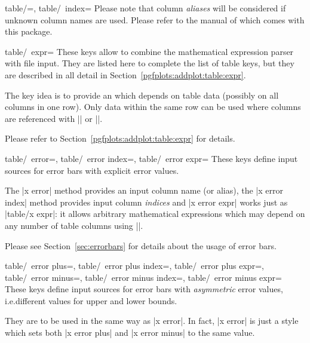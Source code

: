 {\begin{pgfplotsxykeylist}{table/\x=,
    table/\x\ index=}
    Please note that column \emph{aliases} will be considered if unknown column
    names are used. Please refer to the manual of \PGFPlotstable{} which comes
    with this package.
\end{pgfplotsxykeylist}

\begin{pgfplotsxykeylist}{table/\x\ expr=}
    These keys allow to combine the mathematical expression parser with file
    input. They are listed here to complete the list of table keys, but they are
    described in all detail in Section~\ref{pgfplots:addplot:table:expr}.

    The key idea is to provide an  which depends on table data
    (possibly on all columns in one row). Only data within the same row can be
    used where columns are referenced with |\thisrow| or
    |\thisrowno|.

    Please refer to Section~\ref{pgfplots:addplot:table:expr} for details.
\end{pgfplotsxykeylist}

\begin{pgfplotsxykeylist}{%
    table/\x\ error=,
    table/\x\ error index=,
    table/\x\ error expr=%
}
    These keys define input sources for error bars with explicit error values.

    The |x error| method provides an input column name (or alias), the
    |x error index| method provides input column \emph{indices} and
    |x error expr| works just as |table/x expr|: it allows arbitrary
    mathematical expressions which may depend on any number of table columns
    using |\thisrow|.

    Please see Section~\ref{sec:errorbars} for details about the usage of error
    bars.
\end{pgfplotsxykeylist}

\begin{pgfplotsxykeylist}{%
    table/\x\ error plus=,
    table/\x\ error plus index=,
    table/\x\ error plus expr=,
    table/\x\ error minus=,
    table/\x\ error minus index=,
    table/\x\ error minus expr=%
}
    These keys define input sources for error bars with \emph{asymmetric} error
    values, i.e.\@ different values for upper and lower bounds.

    They are to be used in the same way as |x error|. In fact, |x error| is
    just a style which sets both |x error plus| and |x error minus| to the same
    value.


\end{pgfplotsxykeylist}}
